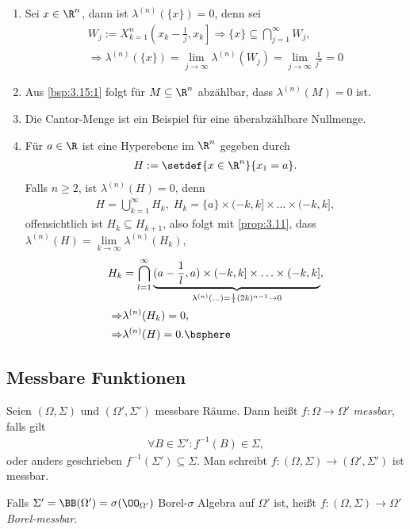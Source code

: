 \begin{bsp}
\label{bsp:3.15}
\begin{enumerate}[label=\arabic{*}.)]
  \item\label{bsp:3.15:1} Sei $x\in\R^n$, dann ist $\lambda^{(n)}(\{x\}) = 0$,
  denn sei
  \begin{align*}
  W_j := X_{k=1}^n \left(x_k- \frac{1}{j},x_k\right] \Rightarrow \{x\} 
  \subseteq \bigcap_{j=1}^\infty W_j,\\
  \Rightarrow \lambda^{(n)}(\{x\}) = \lim\limits_{j\to\infty}
  \lambda^{(n)}(W_j) = \lim\limits_{j\to \infty} \frac{1}{j^n} = 0
  \end{align*}
  \item Aus \ref{bsp:3.15:1} folgt für $M\subseteq\R^n$ abzählbar, dass
  $\lambda^{(n)}(M) = 0$ ist.
  \item Die Cantor-Menge ist ein Beispiel für eine überabzählbare Nullmenge.
  \item Für $a\in\R$ ist eine Hyperebene im $\R^n$ gegeben durch
  \begin{align*}
  H := \setdef{x\in\R^n}{x_1 = a}.
  \end{align*}
Falls $n\ge 2$, ist $\lambda^{(n)}(H) = 0$, denn
\begin{align*}
H=\bigcup_{k=1}^\infty H_k,\; H_k = \{a\}\times(-k,k]\times\ldots\times(-k,k],
\end{align*}
offensichtlich ist $H_k\subseteq H_{k+1}$, also folgt mit \ref{prop:3.11}, dass
$\lambda^{(n)}(H) = \lim\limits_{k\to\infty} \lambda^{(n)}(H_k)$,
\begin{align*}
H_k &= \bigcap_{l=1}^\infty
\underbrace{(a-\frac{1}{l},a)\times(-k,k]\times\ldots\times(-k,k]}_{\lambda^{(n)}(\ldots)
= \frac{1}{l}(2k)^{n-1}\to 0},\\
\Rightarrow &\lambda^{(n)}(H_k) = 0,\\
\Rightarrow &\lambda^{(n)}(H) = 0.\bsphere
\end{align*}
\end{enumerate}
\end{bsp}

\subsection{Messbare Funktionen}
\begin{defn}
\label{defn:3.16}
Seien $(\Omega,\Sigma)$ und $(\Omega',\Sigma')$ messbare Räume. Dann heißt $f:
\Omega\to\Omega'$ \emph{messbar}, falls gilt
\begin{align*}
\forall B\in\Sigma' : f^{-1}(B)\in\Sigma,
\end{align*}
oder anders geschrieben $f^{-1}(\Sigma')\subseteq\Sigma$. Man schreibt $f:(\Omega,\Sigma)\to(\Omega',\Sigma')$ ist messbar.

Falls $\Sigma' = \BB(\Omega') = \sigma(\OO_{\Omega'})$ Borel-$\sigma$ Algebra auf
$\Omega'$ ist, heißt $f: (\Omega,\Sigma) \to \Omega'$
\emph{Borel-messbar}.\fishhere
\end{defn}

